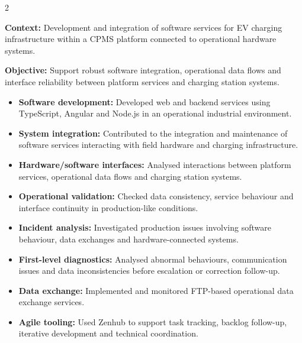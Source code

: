 \documentclass[8pt,a4paper,ragged2e,withhyper]{../_shared/altacv}
\begin{document}



\makecvheader
\vspace{-0.3cm}


\begin{paracol}{2}



\textbf{Context:} Development and integration of software services for EV charging infrastructure within a CPMS platform connected to operational hardware systems.

\textbf{Objective:} Support robust software integration, operational data flows and interface reliability between platform services and charging station systems.

\begin{itemize}
  \item \textbf{Software development:} Developed web and backend services using TypeScript, Angular and Node.js in an operational industrial environment.
  \item \textbf{System integration:} Contributed to the integration and maintenance of software services interacting with field hardware and charging infrastructure.
  \item \textbf{Hardware/software interfaces:} Analysed interactions between platform services, operational data flows and charging station systems.
  \item \textbf{Operational validation:} Checked data consistency, service behaviour and interface continuity in production-like conditions.
  \item \textbf{Incident analysis:} Investigated production issues involving software behaviour, data exchanges and hardware-connected systems.
  \item \textbf{First-level diagnostics:} Analysed abnormal behaviours, communication issues and data inconsistencies before escalation or correction follow-up.
  \item \textbf{Data exchange:} Implemented and monitored FTP-based operational data exchange services.
  \item \textbf{Agile tooling:} Used Zenhub to support task tracking, backlog follow-up, iterative development and technical coordination.
\end{itemize}


\end{paracol}
\end{document}
